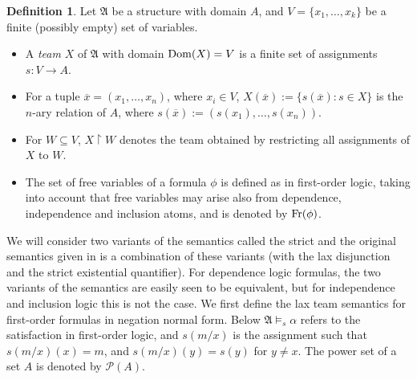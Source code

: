 \documentclass{article}
\theoremstyle{plain}
\theoremstyle{definition}
\newtheorem{definition}[theorem]{Definition}
\newcommand{\mA}{{\mathfrak A}}
\newcommand{\Dom}{{\rm Dom}}
\newcommand{\Fr}{{\rm Fr}}
\newcommand{\tu}[1]{\overline{#1}}
\begin{document}
 
 \begin{definition}
Let $\mA$ be a structure with domain $A$, and $V=\{x_1,\ldots,x_k\}$ be a finite (possibly empty) set  of
variables.
\begin{itemize}
\item A \emph{team} $X$ of $\mA$ with domain $\Dom(X) = V$  is a finite set of assignments $s\colon V\rightarrow A$.
\item For a tuple $\tu x=( x_1,\ldots,x_n)$, where  $x_i\in V$,  $X(\tu x):=\{s(\tu x) : s \in X\}$ is the $n$-ary relation of $A$, where $s(\tu x):=( s(x_1),\ldots,s(x_n))$.
\item For $W\subseteq V$, $X \upharpoonright W$ denotes  the team obtained by restricting all assignments of $X$ to  $W$.
\item  The set of free variables of a formula $\phi$ is  defined as in first-order logic, taking into account that free variables may arise also from dependence, independence and inclusion atoms, and is denoted by $\Fr(\phi)$.
\end{itemize}
\end{definition}
We will consider two variants of the semantics called the strict and
the original semantics given in \cite{vaananen07} is a combination of these variants (with the lax disjunction and the strict existential quantifier). For dependence logic formulas, the two variants of the semantics are easily seen to be equivalent, but for independence and inclusion logic this is not the case. We first define the lax  team semantics for first-order formulas in negation normal form. Below  $\mA \models_s \alpha$ refers to the satisfaction in first-order logic, and $s(m/x)$ is the assignment such that $s(m/x)(x)=m$, and   $s(m/x)(y)=s(y)$ for $y\neq x$. The power set of a set $A$ is denoted by $\mathcal{P}(A)$.
\end{document}
